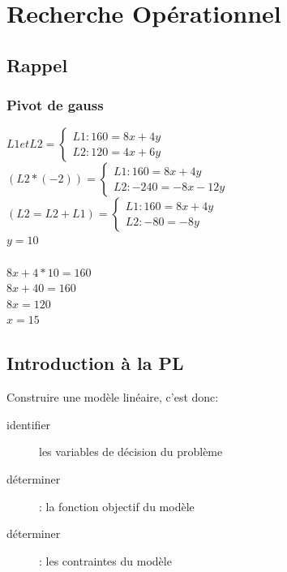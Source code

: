 \chapter{Recherche Opérationnel}
\pagebreak

\section{Rappel}
\subsection{Pivot de gauss}

$ L1 et L2 =
\begin{cases}
L1: 160 = 8x + 4y\\
L2: 120 = 4x + 6y 
\end{cases}$
\\
$( L2*(-2) )=
\begin{cases}
L1: 160 = 8x + 4y\\
L2: -240 = -8x -12y
\end{cases}$
\\
$( L2=L2+L1 )=
\begin{cases}
L1: 160 = 8x + 4y\\
L2: -80 = -8y
\end{cases}$
\\
$y = 10$
\\\\
$8x + 4*10 = 160$\\
$8x + 40 = 160$\\
$8x = 120$\\
$x = 15$\\

\section{Introduction à la PL}

Construire une modèle linéaire, c'est donc:
\begin{description}
\item[identifier] les variables de décision du problème
\item[déterminer]: la fonction objectif du modèle
\item[déterminer]: les contraintes du modèle 
\end{description}

